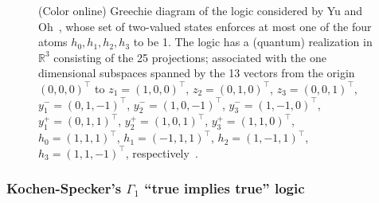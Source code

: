 \documentclass[%
  twocolumn,
 showpacs,
 showkeys,
 preprintnumbers,
 amsmath,amssymb,
 aps,
  pra,
  longbibliography,
 floatfix,
 ]{revtex4-1}
\begin{document}
\begin{figure}
\begin{center}
\end{center}
\caption{\label{2017-b-f-Yu-2012} (Color online) Greechie diagram of the logic considered by Yu and Oh~\cite[Fig.~2]{Yu-2012},
whose  set of two-valued states enforces at most one of the four atoms $h_0,h_1,h_2,h_3$ to be 1.
The logic has a (quantum) realization in $\mathbb{R}^3$
consisting of the 25 projections;  associated with the one dimensional subspaces
spanned by  the 13 vectors from the origin $\left(0,0,0\right)^\intercal$ to
$z_1 = \left( 1, 0, 0 \right)^\intercal $,
$z_2 = \left( 0, 1, 0 \right)^\intercal $,
$z_3 = \left( 0, 0, 1 \right)^\intercal $,
$y^-_1 = \left( 0, 1, -1 \right)^\intercal $,
$y^-_2 = \left( 1, 0, -1 \right)^\intercal $,
$y^-_3 = \left( 1, -1, 0 \right)^\intercal $,
$y^+_1 = \left( 0, 1, 1 \right)^\intercal $,
$y^+_2 = \left( 1, 0, 1 \right)^\intercal $,
$y^+_3 = \left( 1, 1, 0 \right)^\intercal $,
$h_0 = \left( 1, 1, 1 \right)^\intercal $,
$h_1 = \left( -1, 1, 1 \right)^\intercal $,
$h_2 = \left( 1, -1, 1 \right)^\intercal $,
$h_3 = \left( 1, 1, -1 \right)^\intercal $,
respectively~\cite{Yu-2012}.
}
\end{figure}


\subsubsection{Kochen-Specker's $\Gamma_1$ ``true implies true'' logic}
\end{document}
